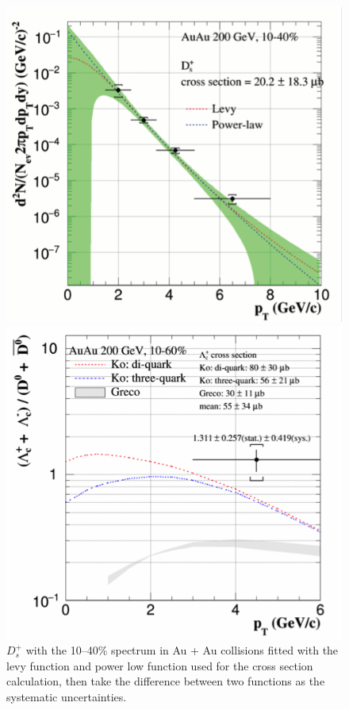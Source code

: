 \begin{figure}[htbp]
\begin{minipage}[htbp]{0.47\linewidth}
\centering
\includegraphics[width=1.0\textwidth,angle=0]{figure/Run14_D0HFT/ccx_3.png}
\caption{$D_{s}^{+}$ with the 10--40\% spectrum in Au + Au collisions fitted with the levy function and power low function used for the cross section calculation, then take the difference between two functions as the systematic uncertainties. \label{ccx_3}}
\end{minipage}
\hfill
\begin{minipage}[htbp]{0.47\linewidth}
\centering
\includegraphics[width=1.0\textwidth,angle=0]{figure/Run14_D0HFT/ccx_4.png}

\end{minipage}
\end{figure}
